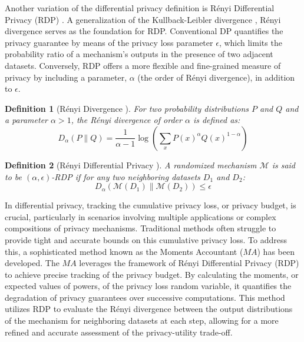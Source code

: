 \documentclass[11pt]{article}
\newtheorem{defn}{Definition}
\begin{document}
Another variation of the differential privacy definition is Rényi Differential Privacy (RDP) \cite{mironov2017renyi}. A generalization of the Kullback-Leibler divergence \cite{kullrenyi}, Rényi divergence serves as the foundation for RDP. Conventional DP quantifies the privacy guarantee by means of the privacy loss parameter $\epsilon$, which limits the probability ratio of a mechanism's outputs in the presence of two adjacent datasets. Conversely, RDP offers a more flexible and fine-grained measure of privacy by including a parameter, $\alpha$ (the order of Rényi divergence), in addition to $\epsilon$.

\begin{defn}[Rényi Divergence \cite{chen2020stochastic,mironov2017renyi}]
For two probability distributions $P$ and $Q$ and a parameter $\alpha > 1$,  the Rényi divergence of order $\alpha$ is defined as:
\[
D_{\alpha}(P \| Q) = \frac{1}{\alpha - 1} \log \left( \sum_{x} P(x)^{\alpha} Q(x)^{1-\alpha} \right)
\]
\end{defn}

\begin{defn}[Rényi Differential Privacy \cite{chen2020stochastic,mironov2017renyi}]
A randomized mechanism $\mathcal{M}$ is said to be $(\alpha, \epsilon)$-RDP if for any two neighboring datasets $D_1$ and $D_2$:
\[
D_{\alpha}(\mathcal{M}(D_1) \| \mathcal{M}(D_2)) \leq \epsilon
\]
\end{defn}

In differential privacy, tracking the cumulative privacy loss, or privacy budget, is crucial, particularly in scenarios involving multiple applications or complex compositions of privacy mechanisms. Traditional methods often struggle to provide tight and accurate bounds on this cumulative privacy loss. To address this, a sophisticated method known as the Moments Accountant ($MA$) has been developed. The $MA$ leverages the framework of Rényi Differential Privacy (RDP) to achieve precise tracking of the privacy budget. By calculating the moments, or expected values of powers, of the privacy loss random variable, it quantifies the degradation of privacy guarantees over successive computations. This method utilizes RDP to evaluate the Rényi divergence between the output distributions of the mechanism for neighboring datasets at each step, allowing for a more refined and accurate assessment of the privacy-utility trade-off. 
\end{document}
